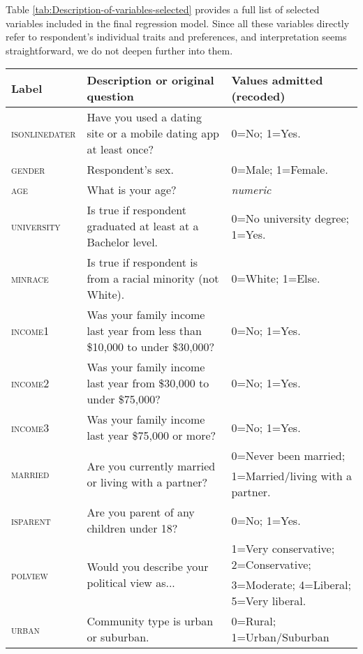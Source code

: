 Table \ref{tab:Description-of-variables-selected} provides a full
list of selected variables included in the final regression model.
Since all these variables directly refer to respondent\textquoteright s
individual traits and preferences, and interpretation seems straightforward,
we do not deepen further into them.\clearpage{}\pagestyle{plain}
\begin{sidewaystable}
\centering{}%
\begin{minipage}[t]{1\columnwidth}%
\begin{center}
\renewcommand{\arraystretch}{1.2}%
\begin{tabular}{lll}
\hline 
\textbf{Label} & \textbf{Description or original question} & \textbf{Values admitted (recoded)}\tabularnewline
\hline 
\hline 
\textsc{\small{}isonlinedater} & {\small{}Have you used a dating site or a mobile dating app at least
once?} & {\small{}0=No; 1=Yes.}\tabularnewline
\textsc{\small{}gender} & {\small{}Respondent's sex.} & {\small{}0=Male; 1=Female.}\tabularnewline
\textsc{\small{}age} & {\small{}What is your age? } & \textsl{\small{}numeric}\tabularnewline
\textsc{\small{}university} & {\small{}Is true if respondent graduated at least at a Bachelor level.} & {\small{}0=No university degree; 1=Yes.}\tabularnewline
\textsc{\small{}minrace} & {\small{}Is true if respondent is from a racial minority (not White).} & {\small{}0=White; 1=Else.}\tabularnewline
\multirow{1}{*}{\textsc{\small{}income1}} & {\small{}Was your family income last year from less than \$10,000
to under \$30,000?} & \multirow{1}{*}{{\small{}0=No; 1=Yes.}}\tabularnewline
\multirow{1}{*}{\textsc{\small{}income2}} & {\small{}Was your family income last year from \$30,000 to under \$75,000?} & \multirow{1}{*}{{\small{}0=No; 1=Yes.}}\tabularnewline
\textsc{\small{}income3} & {\small{}Was your family income last year \$75,000 or more?} & {\small{}0=No; 1=Yes.}\tabularnewline
\multirow{2}{*}{\textsc{\small{}married}} & \multirow{2}{*}{{\small{}Are you currently married or living with a partner?}} & {\small{}0=Never been married;}\tabularnewline
 &  & {\small{}1=Married/living with a partner.}\tabularnewline
\textsc{\small{}isparent} & {\small{}Are you parent of any children under 18?} & {\small{}0=No; 1=Yes.}\tabularnewline
\multirow{2}{*}{\textsc{\small{}polview}} & \multirow{2}{*}{{\small{}Would you describe your political view as...}} & {\small{}1=Very conservative; 2=Conservative;}\tabularnewline
 &  & {\small{}3=Moderate; 4=Liberal; 5=Very liberal.}\tabularnewline
\textsc{\small{}urban} & {\small{}Community type is urban or suburban.} & {\small{}0=Rural; 1=Urban/Suburban}\tabularnewline

\end{tabular}
\end{center}
\end{minipage}
\end{sidewaystable}
